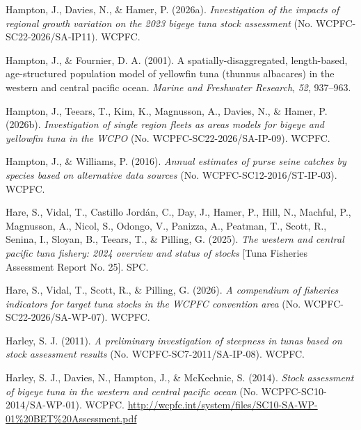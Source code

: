 \documentclass[
  english,
  a4paper,
  a4paper,
  11pt]{SCreport}
\newlength{\cslhangindent}
\newenvironment{CSLReferences}[2] %
 {\begin{list}{}{%
  \setlength{\itemindent}{0pt}
  \setlength{\leftmargin}{0pt}
  \setlength{\parsep}{0pt}
  \ifodd #1
   \setlength{\leftmargin}{\cslhangindent}
   \setlength{\itemindent}{-1\cslhangindent}
  \fi
  \setlength{\itemsep}{#2\baselineskip}}}
 {\end{list}}
\begin{document}
\begin{CSLReferences}{1}{0}
Hampton, J., Davies, N., \& Hamer, P. (2026a). \emph{Investigation of
the impacts of regional growth variation on the 2023 bigeye tuna stock
assessment} (No. {WCPFC}-{SC}22-2026/{SA}-{IP}11). WCPFC.

Hampton, J., \& Fournier, D. A. (2001). A spatially-disaggregated,
length-based, age-structured population model of yellowfin tuna (thunnus
albacares) in the western and central pacific ocean. \emph{Marine and
Freshwater Research}, \emph{52}, 937--963.

Hampton, J., Teears, T., Kim, K., Magnusson, A., Davies, N., \& Hamer,
P. (2026b). \emph{Investigation of single region fleets as areas models
for bigeye and yellowfin tuna in the {WCPO}} (No.
{WCPFC}-{SC}22-2026/{SA}-{IP}-09). WCPFC.

Hampton, J., \& Williams, P. (2016). \emph{Annual estimates of purse
seine catches by species based on alternative data sources} (No.
{WCPFC}-{SC}12-2016/{ST}-{IP}-03). WCPFC.

Hare, S., Vidal, T., Castillo Jordán, C., Day, J., Hamer, P., Hill, N.,
Machful, P., Magnusson, A., Nicol, S., Odongo, V., Panizza, A., Peatman,
T., Scott, R., Senina, I., Sloyan, B., Teears, T., \& Pilling, G.
(2025). \emph{The western and central pacific tuna fishery: 2024
overview and status of stocks} {[}Tuna Fisheries Assessment Report No.
25{]}. SPC.

Hare, S., Vidal, T., Scott, R., \& Pilling, G. (2026). \emph{A
compendium of fisheries indicators for target tuna stocks in the {WCPFC}
convention area} (No. {WCPFC}-{SC}22-2026/{SA}-{WP}-07). WCPFC.

Harley, S. J. (2011). \emph{A preliminary investigation of steepness in
tunas based on stock assessment results} (No.
{WCPFC}-{SC}7-2011/{SA}-{IP}-08). WCPFC.

Harley, S. J., Davies, N., Hampton, J., \& McKechnie, S. (2014).
\emph{Stock assessment of bigeye tuna in the western and central pacific
ocean} (No. {WCPFC}-{SC}10-2014/{SA}-{WP}-01). WCPFC.
\url{http://wcpfc.int/system/files/SC10-SA-WP-01\%20BET\%20Assessment.pdf}


\end{CSLReferences}
\end{document}
